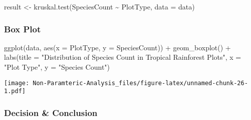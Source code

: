 \documentclass[
]{article}
\newenvironment{Shaded}{\begin{snugshade}}{\end{snugshade}}
\newcommand{\AttributeTok}[1]{\textcolor[rgb]{0.77,0.63,0.00}{#1}}
\newcommand{\ControlFlowTok}[1]{\textcolor[rgb]{0.13,0.29,0.53}{\textbf{#1}}}
\newcommand{\FloatTok}[1]{\textcolor[rgb]{0.00,0.00,0.81}{#1}}
\newcommand{\FunctionTok}[1]{\textcolor[rgb]{0.00,0.00,0.00}{#1}}
\newcommand{\NormalTok}[1]{#1}
\newcommand{\OtherTok}[1]{\textcolor[rgb]{0.56,0.35,0.01}{#1}}
\newcommand{\SpecialCharTok}[1]{\textcolor[rgb]{0.00,0.00,0.00}{#1}}
\newcommand{\StringTok}[1]{\textcolor[rgb]{0.31,0.60,0.02}{#1}}
\begin{document}
\begin{Shaded}
\begin{Highlighting}[]
\NormalTok{result }\OtherTok{\textless{}{-}} \FunctionTok{kruskal.test}\NormalTok{(SpeciesCount }\SpecialCharTok{\textasciitilde{}}\NormalTok{ PlotType, }\AttributeTok{data =}\NormalTok{ data)}
\end{Highlighting}
\end{Shaded}

\hypertarget{box-plot}{%
\subsubsection{Box Plot}\label{box-plot}}

\begin{Shaded}
\begin{Highlighting}[]
\FunctionTok{ggplot}\NormalTok{(data, }\FunctionTok{aes}\NormalTok{(}\AttributeTok{x =}\NormalTok{ PlotType, }\AttributeTok{y =}\NormalTok{ SpeciesCount)) }\SpecialCharTok{+}
  \FunctionTok{geom\_boxplot}\NormalTok{() }\SpecialCharTok{+}
  \FunctionTok{labs}\NormalTok{(}\AttributeTok{title =} \StringTok{"Distribution of Species Count in Tropical Rainforest Plots"}\NormalTok{,}
       \AttributeTok{x =} \StringTok{"Plot Type"}\NormalTok{, }\AttributeTok{y =} \StringTok{"Species Count"}\NormalTok{)}
\end{Highlighting}
\end{Shaded}

\texttt{[image: Non-Paramteric-Analysis\_files/figure-latex/unnamed-chunk-26-1.pdf]}

\hypertarget{decision-conclusion-2}{%
\subsubsection{Decision \& Conclusion}\label{decision-conclusion-2}}

\begin{Shaded}
\end{Shaded}
\end{document}
